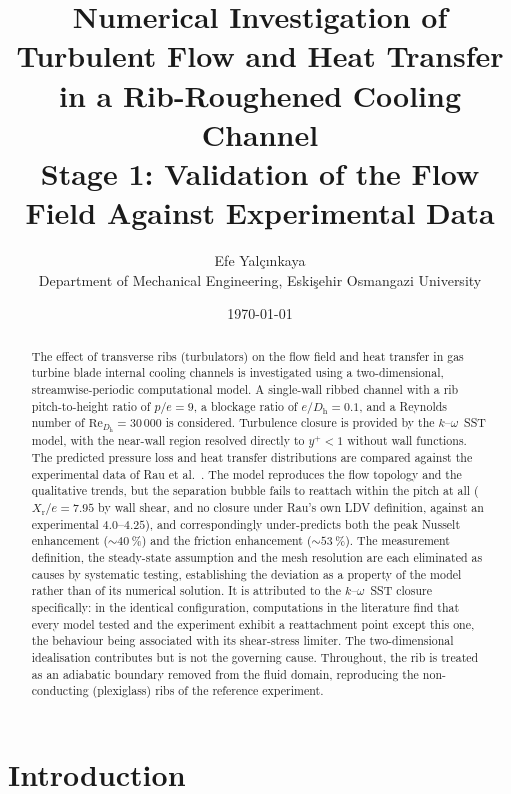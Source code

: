 \documentclass[11pt,a4paper]{article}
\title{\textbf{Numerical Investigation of Turbulent Flow and Heat Transfer
in a Rib-Roughened Cooling Channel}\\[0.4em]
\large Stage 1: Validation of the Flow Field Against Experimental Data}
\author{Efe Yal\c{c}\i nkaya\\
\small Department of Mechanical Engineering, Eski\c{s}ehir Osmangazi University}
\date{\today}
\newcommand{\Dh}{D_{\mathrm{h}}}
\newcommand{\Rey}{\mathrm{Re}}
\newcommand{\Xr}{X_{\mathrm{r}}}
\begin{document}
\maketitle

\begin{abstract}
\noindent
The effect of transverse ribs (turbulators) on the flow field and heat
transfer in gas turbine blade internal cooling channels is investigated
using a two-dimensional, streamwise-periodic computational model. A
single-wall ribbed channel with a rib pitch-to-height ratio of $p/e = 9$,
a blockage ratio of $e/\Dh = 0.1$, and a Reynolds number of
$\Rey_{\Dh} = 30\,000$ is considered. Turbulence closure is provided by the
$k$--$\omega$~SST model, with the near-wall region resolved directly to
$y^{+} < 1$ without wall functions. The predicted pressure loss and heat
transfer distributions are compared against the experimental data of Rau
et al.~\cite{rau1996}. The model reproduces the flow topology and the
qualitative trends, but the separation bubble fails to reattach within the
pitch at all ($\Xr/e = 7.95$ by wall shear, and no closure under Rau's own
LDV definition, against an experimental $4.0$--$4.25$), and
correspondingly under-predicts both the peak Nusselt enhancement
($\sim\!\SI{40}{\percent}$) and the friction enhancement
($\sim\!\SI{53}{\percent}$). The measurement definition, the steady-state
assumption and the mesh resolution are each eliminated as causes by
systematic testing, establishing the deviation as a property of the model
rather than of its numerical solution. It is attributed to the
$k$--$\omega$~SST closure specifically: in the identical configuration,
computations in the literature find that every model tested and the
experiment exhibit a reattachment point except this one, the behaviour being
associated with its shear-stress limiter. The two-dimensional idealisation
contributes but is not the governing cause. Throughout,
the rib is treated as
an adiabatic boundary removed from the fluid domain, reproducing the
non-conducting (plexiglass) ribs of the reference experiment.
\end{abstract}

\tableofcontents
\bigskip

\section{Introduction}
\end{document}
